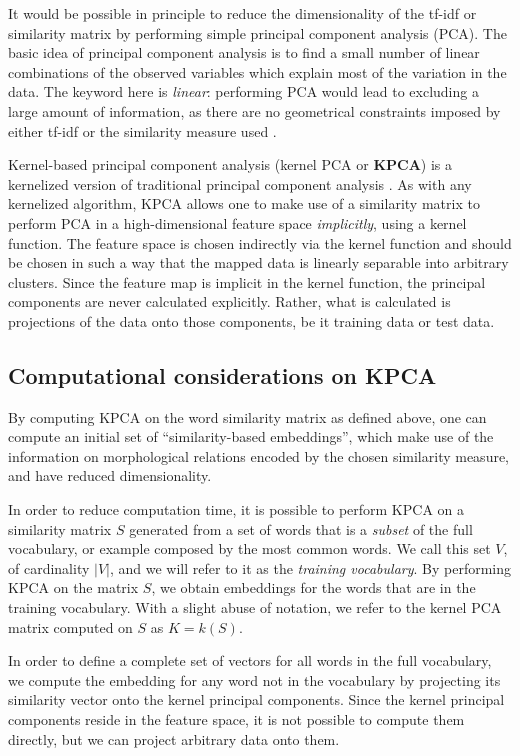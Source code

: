 It would be possible in principle to reduce the dimensionality of the tf-idf or similarity matrix by performing simple principal component analysis (PCA).
The basic idea of principal component analysis is to find a small number of linear combinations of the observed variables which explain most of the variation in the data.
The keyword here is \emph{linear}: performing PCA would lead to excluding a large amount of information, as there are no geometrical constraints imposed by either tf-idf or the similarity measure used \cite{arora_latent_2016}.

Kernel-based principal component analysis (kernel PCA or \textbf{KPCA}) is a kernelized version of traditional principal component analysis \cite{hastie_elements_2013}.
As with any kernelized algorithm, KPCA allows one to make use of a similarity matrix to perform  PCA in a high-dimensional feature space \emph{implicitly}, using a kernel function.
The feature space is chosen indirectly via the kernel function and should be chosen in such a way that the mapped data is linearly separable into arbitrary clusters.
Since the feature map is implicit in the kernel function, the principal components are never calculated explicitly.
Rather, what is calculated is projections of the data onto those components, be it training data or test data.

\subsection{Computational considerations on KPCA}

By computing KPCA on the word similarity matrix as defined above, one can compute an initial set of ``similarity-based embeddings'', which make use of the information on morphological relations encoded by the chosen similarity measure, and have reduced dimensionality.

In order to reduce computation time, it is possible to perform KPCA on a similarity matrix $S$ generated from a set of words that is a \textit{subset} of the full vocabulary, or example composed by the most common words. We call this set $V$, of cardinality $|V|$, and we will refer to it as the \emph{training vocabulary}. 
By performing KPCA on the matrix $S$, we obtain embeddings for the words that are in the training vocabulary.
With a slight abuse of notation, we refer to the kernel PCA matrix computed on $S$ as $K = k(S)$.

In order to define a complete set of vectors for all words in the full vocabulary, we compute the embedding for any word not in the vocabulary by projecting its similarity vector onto the kernel principal components.
Since the kernel principal components reside in the feature space, it is not possible to compute them directly, but we can project arbitrary data onto them.

